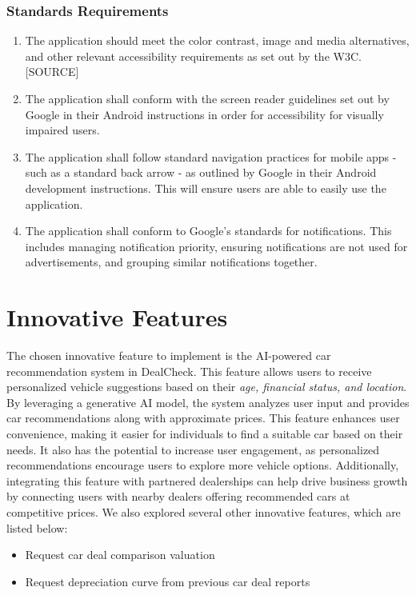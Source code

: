 \documentclass[]{article}
\begin{document}
\begin{enumerate}
\subsubsection{Standards Requirements}
\label{ssub:standards_requirements}
\begin{enumerate}[{LR-STD}1. ]
	\item The application should meet the color contrast, image and media alternatives, and other relevant accessibility requirements as set out by the W3C. [SOURCE]
	\item The application shall conform with the screen reader guidelines set out by Google in their Android instructions in order for accessibility for visually impaired users.
	\item The application shall follow standard navigation practices for mobile apps - such as a standard back arrow - as outlined by Google in their Android development instructions. This will ensure users are able to easily use the application.
	\item The application shall conform to Google’s standards for notifications. This includes managing notification priority, ensuring notifications are not used for advertisements, and grouping similar notifications together.
\end{enumerate}



\section{Innovative Features}
\label{sec:innovative_features}
The chosen innovative feature to implement is the AI-powered car recommendation system in DealCheck. This feature allows users to receive personalized vehicle suggestions based on their \textit{age, financial status, and location}. By leveraging a generative AI model, the system analyzes user input and provides car recommendations along with approximate prices. This feature enhances user convenience, making it easier for individuals to find a suitable car based on their needs. It also has the potential to increase user engagement, as personalized recommendations encourage users to explore more vehicle options. Additionally, integrating this feature with partnered dealerships can help drive business growth by connecting users with nearby dealers offering recommended cars at competitive prices. We also explored several other innovative features, which are listed below:
\begin{itemize}
    \item Request car deal comparison valuation
    \item Request depreciation curve from previous car deal reports
\end{itemize}


\end{enumerate}
\end{document}

